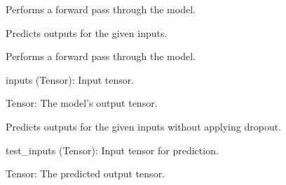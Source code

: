 \documentclass[letterpaper,10pt,english]{sphinxmanual}
\begin{document}
\begin{fulllineitems}
\begin{description}
\begin{description}
\end{description}

\begin{description}
\sphinxAtStartPar
Performs a forward pass through the model.

\sphinxAtStartPar
Predicts outputs for the given inputs.

\end{description}

\end{description}

\begin{fulllineitems}
\label{\detokenize{architecture:architecture.MultipleRegression.forward}}
\pysigstartsignatures
{}
\pysigstopsignatures
\sphinxAtStartPar
Performs a forward pass through the model.
\begin{description}
\sphinxAtStartPar
inputs (Tensor): Input tensor.

\sphinxAtStartPar
Tensor: The model’s output tensor.

\end{description}

\end{fulllineitems}


\begin{fulllineitems}
\label{\detokenize{architecture:architecture.MultipleRegression.predict}}
\pysigstartsignatures
{}
\pysigstopsignatures
\sphinxAtStartPar
Predicts outputs for the given inputs without applying dropout.
\begin{description}
\sphinxAtStartPar
test\_inputs (Tensor): Input tensor for prediction.

\sphinxAtStartPar
Tensor: The predicted output tensor.

\end{description}


\end{fulllineitems}
\end{fulllineitems}
\end{document}
